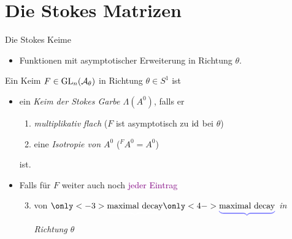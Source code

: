 \section{Die Stokes Matrizen}
\begin{frame}{Die Stokes Keime}
  \begin{defn}
    \vspace{-3em}
    \begin{flushright}
      \begin{minipage}{.55\textwidth}
        \begin{itemize}
        \item[\tikzmarkc{n1}{blue}] Funktionen mit asymptotischer Erweiterung
          in Richtung $\theta$.
        \end{itemize}
      \end{minipage}
    \end{flushright}
    \begin{flushright}
    \end{flushright}
    \vspace{-2em}
    Ein Keim $F\in\Gl_n(\overset{\tikzmark{e1}}{\cA_\theta})$ in Richtung
    $\theta\in S^1$ ist
    \begin{itemize}
    \item ein \emph{Keim der Stokes Garbe \boldmath$\Lambda(A^0)$}, falls er
      \begin{enumerate}
      \item\emph{multiplikativ flach} ($F$ ist asymptotisch zu $\operatorname{id}$ bei
        $\theta$) 
      \item<2-> eine \emph{Isotropie von \boldmath$A^0$} (${}^FA^0=A^0$)
      \end{enumerate}
      ist.
    \item<3-> Falls für $F$ weiter auch noch \textcolor{purple}{jeder Eintrag}
      \begin{enumerate}
        \setcounter{enumi}{2}
      \item von
        \emph{$\underset{\tikzmarkt{e2}}{%
              \only<-3>{%
                \textcolor{white}{\underbrace{\text{%
                      \textcolor{black}{maximal decay}}}}
              }
              \only<4->{%
                \textcolor{blue!50!white}{\underbrace{\text{%
                      \textcolor{black}{maximal decay}}}}
              }
            }$
          in Richtung \boldmath$\theta$}
\end{enumerate}
\end{itemize}
\end{defn}
\end{frame}
